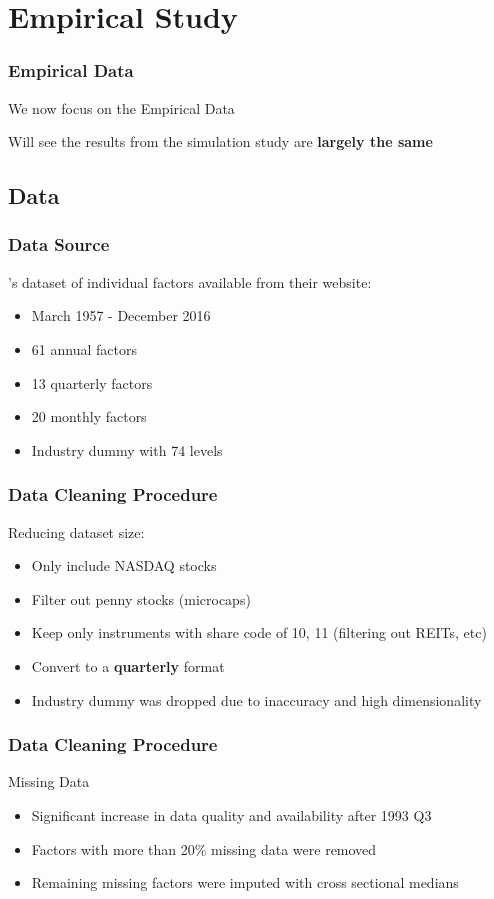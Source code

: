 \documentclass[aspectratio=169]{beamer}
\begin{document}
\section{Empirical Study}

\begin{frame}
\frametitle{Empirical Data}
We now focus on the Empirical Data

Will see the results from the simulation study are \textbf{largely the same}
\end{frame}

\subsection{Data}

\begin{frame}
\frametitle{Data Source}
\cite{gu_empirical_2018}'s dataset of individual factors available from their website:
\begin{itemize}
	\item March 1957 - December 2016
	\item 61 annual factors
	\item 13 quarterly factors
	\item 20 monthly factors
	\item Industry dummy with 74 levels
\end{itemize}
\end{frame}

\begin{frame}
\frametitle{Data Cleaning Procedure}
Reducing dataset size:
\begin{itemize}
	\item Only include NASDAQ stocks
	\item Filter out penny stocks (microcaps)
	\item Keep only instruments with share code of 10, 11 (filtering out REITs, etc)
	\item Convert to a \textbf{quarterly} format
	\item Industry dummy was dropped due to inaccuracy and high dimensionality
\end{itemize}
\end{frame}

\begin{frame}
\frametitle{Data Cleaning Procedure}
Missing Data
\begin{itemize}
	\item Significant increase in data quality and availability after 1993 Q3
	\item Factors with more than 20\% missing data were removed
	\item Remaining missing factors were imputed with cross sectional medians
\end{itemize}
\end{frame}
\end{document}
